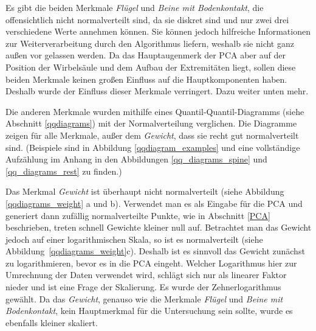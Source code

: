  Es gibt die beiden Merkmale \emph{Flügel} und \emph{Beine mit Bodenkontakt}, die offensichtlich nicht normalverteilt sind, da sie diskret sind und nur zwei \bzw drei verschiedene Werte annehmen können. Sie können jedoch hilfreiche Informationen zur Weiterverarbeitung durch den Algorithmus liefern, weshalb sie nicht ganz außen vor gelassen werden. Da das Hauptaugenmerk der PCA aber auf der Position der Wirbelsäule und dem Aufbau der Extremitäten liegt, sollen diese beiden Merkmale keinen großen Einfluss auf die Hauptkomponenten haben. Deshalb wurde der Einfluss dieser Merkmale verringert. Dazu weiter unten mehr.
 
 Die anderen Merkmale wurden mithilfe eines Quantil-Quantil-Diagramms (siehe Abschnitt \ref{qqdiagrams}) mit der Normalverteilung verglichen.
 Die Diagramme zeigen für alle Merkmale, außer dem \emph{Gewicht}, dass sie recht gut normalverteilt sind. (Beispiele sind in Abbildung \ref{qqdiagram_examples} und eine vollständige Aufzählung im Anhang in den Abbildungen \ref{qq_diagrams_spine} und \ref{qq_diagrams_rest} zu finden.)
 
 Das Merkmal \emph{Gewicht} ist überhaupt nicht normalverteilt (siehe Abbildung \ref{qqdiagrams_weight} a und b). Verwendet man es als Eingabe für die PCA und generiert dann zufällig normalverteilte Punkte, wie in Abschnitt \ref{PCA} beschrieben, treten schnell Gewichte kleiner null auf.
 Betrachtet man das Gewicht jedoch auf einer logarithmischen Skala, so ist es normalverteilt (siehe Abbildung~\ref{qqdiagrams_weight}c). Deshalb ist es sinnvoll das Gewicht zunächst zu logarithmieren, bevor es in die PCA eingeht.
 Welcher Logarithmus hier zur Umrechnung der Daten verwendet wird, schlägt sich nur als linearer Faktor nieder und ist eine Frage der Skalierung. Es wurde der Zehnerlogarithmus gewählt. 
 Da das \emph{Gewicht}, genauso wie die Merkmale \emph{Flügel} und \emph{Beine mit Bodenkontakt}, kein Hauptmerkmal für die Untersuchung sein sollte, wurde es ebenfalls kleiner skaliert.
 
